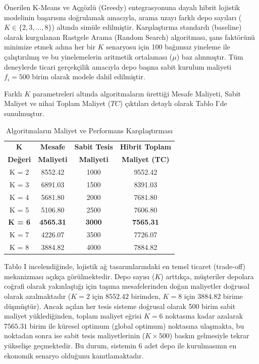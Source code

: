 \documentclass[conference]{IEEEtran}
\begin{document}
Önerilen K-Means ve Açgözlü (Greedy) entegrasyonuna dayalı hibrit lojistik modelinin başarısını doğrulamak amacıyla, arama uzayı farklı depo sayıları ($K \in \{2, 3, \dots, 8\}$) altında simüle edilmiştir. Karşılaştırma standardı (baseline) olarak kurgulanan Rastgele Arama (Random Search) algoritması, şans faktörünü minimize etmek adına her bir $K$ senaryosu için 100 bağımsız yineleme ile çalıştırılmış ve bu yinelemelerin aritmetik ortalaması ($\mu$) baz alınmıştır. Tüm deneylerde ticari gerçekçilik amacıyla depo başına sabit kurulum maliyeti $f_i = 500$ birim olarak modele dahil edilmiştir.
 
Farklı $K$ parametreleri altında algoritmaların ürettiği Mesafe Maliyeti, Sabit Maliyet ve nihai Toplam Maliyet ($TC$) çıktıları detaylı olarak Tablo I'de sunulmuştur.

\begin{table}[htbp]
\caption{Algoritmaların Maliyet ve Performans Karşılaştırması}
\begin{center}
\begin{tabular}{|c|c|c|c|}
\hline
\textbf{K} & \textbf{Mesafe} & \textbf{Sabit Tesis} & \textbf{Hibrit Toplam} \\
\textbf{Değeri} & \textbf{Maliyeti} & \textbf{Maliyeti} & \textbf{Maliyet (TC)} \\ \hline
K = 2  & 8552.42 & 1000 & 9552.42 \\ \hline
K = 3  & 6891.03 & 1500 & 8391.03 \\ \hline
K = 4  & 5681.80 & 2000 & 7681.80 \\ \hline
K = 5  & 5106.80 & 2500 & 7606.80 \\ \hline
\textbf{K = 6}  & \textbf{4565.31} & \textbf{3000} & \textbf{7565.31} \\ \hline
K = 7  & 4226.07 & 3500 & 7726.07 \\ \hline
K = 8  & 3884.82 & 4000 & 7884.82 \\ \hline
\end{tabular}
\label{tab:maliyet_tablosu}
\end{center}
\end{table}

Tablo I incelendiğinde, lojistik ağ tasarımlarındaki en temel ticaret (trade-off) mekanizması açıkça görülmektedir. Depo sayısı ($K$) arttıkça, müşteriler depolara coğrafi olarak yakınlaştığı için taşıma mesafelerinden doğan maliyetler doğrusal olarak azalmaktadır ($K=2$ için $8552.42$ birimden, $K=8$ için $3884.82$ birime düşmüştür). Ancak açılan her tesis sisteme doğrusal olarak 500 birim sabit maliyet yüklediğinden, toplam maliyet eğrisi $K=6$ noktasına kadar azalarak $7565.31$ birim ile küresel optimum (global optimum) noktasına ulaşmakta, bu noktadan sonra ise sabit tesis maliyetlerinin ($K \times 500$) baskın gelmesiyle tekrar yükselişe geçmektedir. Bu durum, sistemin 6 adet depo ile kurulmasının en ekonomik senaryo olduğunu kanıtlamaktadır.
\end{document}
